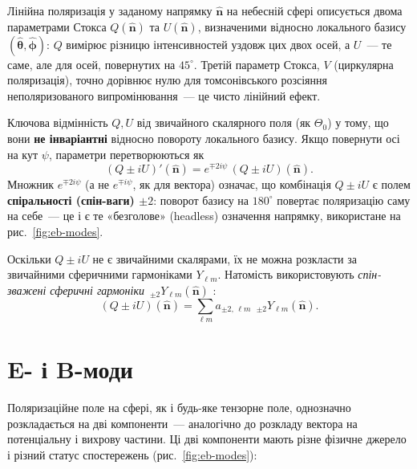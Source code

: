 Лінійна поляризація у заданому напрямку $\hat{\mathbf{n}}$ на небесній
сфері описується двома параметрами Стокса $Q(\hat{\mathbf{n}})$ та
$U(\hat{\mathbf{n}})$, визначеними відносно локального базису
$(\hat{\boldsymbol\theta}, \hat{\boldsymbol\phi})$: $Q$ вимірює різницю
інтенсивностей уздовж цих двох осей, а $U$~--- те саме, але для осей,
повернутих на $45^\circ$. Третій параметр Стокса, $V$ (циркулярна
поляризація), точно дорівнює нулю для томсонівського розсіяння
неполяризованого випромінювання~--- це чисто лінійний ефект.

Ключова відмінність $Q,U$ від звичайного скалярного поля (як $\Theta_0$)
у тому, що вони \textbf{не інваріантні} відносно повороту локального
базису. Якщо повернути осі на кут $\psi$, параметри перетворюються як
\begin{equation}\label{eq:QU_rotation}
    (Q \pm iU)'(\hat{\mathbf{n}}) = e^{\mp 2i\psi}\,(Q \pm iU)(\hat{\mathbf{n}}).
\end{equation}
Множник $e^{\mp 2i\psi}$ (а не $e^{\mp i\psi}$, як для вектора) означає,
що комбінація $Q\pm iU$ є полем \textbf{спіральності (спін-ваги) $\pm2$}:
поворот базису на $180^\circ$ повертає поляризацію саму на себе~---
це і є те «безголове» (headless) означення напрямку, використане на
рис.~\ref{fig:eb-modes}.

Оскільки $Q\pm iU$ не є звичайними скалярами, їх не можна розкласти за
звичайними сферичними гармоніками $Y_{\ell m}$. Натомість використовують
\emph{спін-зважені сферичні гармоніки} $\,_{\pm2}Y_{\ell m}(\hat{\mathbf{n}})$
\cite{zaldarriaga_seljak_1997, kamionkowski_kosowsky_stebbins_1997}:
\begin{equation}\label{eq:QU_expansion}
    (Q \pm iU)(\hat{\mathbf{n}}) = \sum_{\ell m} a_{\pm 2,\,\ell m}\;\, _{\pm2}Y_{\ell m}(\hat{\mathbf{n}}).
\end{equation}

\section{E- і B-моди}

Поляризаційне поле на сфері, як і будь-яке тензорне поле,
однозначно розкладається на дві компоненти~--- аналогічно
до розкладу вектора на потенціальну і вихрову частини.
Ці дві компоненти мають різне фізичне джерело і різний
статус спостережень (рис.~\ref{fig:eb-modes}):

